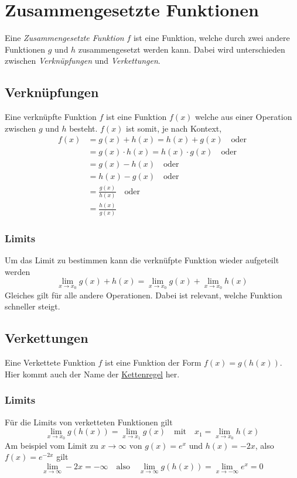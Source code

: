 \documentclass{article}
\begin{document}
 
\section{Zusammengesetzte Funktionen} 
Eine \emph{Zusammengesetzte Funktion} $f$ ist eine Funktion, welche durch zwei andere Funktionen $g$ und $h$ zusammengesetzt werden kann. Dabei wird unterschieden zwischen \emph{Verknüpfungen} und \emph{Verkettungen}.
 
\subsection{Verknüpfungen}
Eine verknüpfte Funktion $f$ ist eine Funktion $f(x)$ welche aus einer Operation zwischen $g$ und $h$ besteht. $f(x)$ ist somit, je nach Kontext,
\begin{align*}
 f(x) &= g(x)+h(x) = h(x)+g(x) \quad \text{oder} \\
  &= g(x) \cdot h(x) = h(x) \cdot g(x) \quad \text{oder} \\
  &= g(x) - h(x) \quad \text{oder} \\
  &= h(x) - g(x) \quad \text{oder} \\
  &= \frac{g(x)}{h(x)} \quad \text{oder} \\
  &= \frac{h(x)}{g(x)}
\end{align*}
 
\subsubsection{Limits} 
Um das Limit zu bestimmen kann die verknüfpte Funktion wieder aufgeteilt werden
\[
 \lim_{x \to x_0} g(x)+h(x) = \lim_{x \to x_0} g(x) + \lim_{x \to x_0} h(x) 
\]
Gleiches gilt für alle andere Operationen. Dabei ist relevant, welche Funktion schneller steigt. 
 
 
\subsection{Verkettungen}
Eine Verkettete Funktion $f$ ist eine Funktion der Form $f(x) = g(h(x))$. Hier kommt auch der Name der \hyperref[Ableitungen]{Kettenregel} her.
 
\subsubsection{Limits} 
Für die Limits von verketteten Funktionen gilt 
\[  
 \lim_{x \to x_0} g(h(x)) = \lim_{x \to x_1} g(x)
 \quad \text{mit} \quad
 x_1 = \lim_{x \to x_0} h(x)  
\]
Am beispiel vom Limit zu $x \to \infty$ von $g(x)=e^x$ und $h(x) = -2x$, also $f(x)=e^{-2x}$ gilt 
\[  
 \lim_{x \to \infty} -2x = -\infty
 \quad \text{also} \quad
 \lim_{x \to \infty} g(h(x)) = \lim_{x \to -\infty} e^x = 0
\]
 
\end{document}
